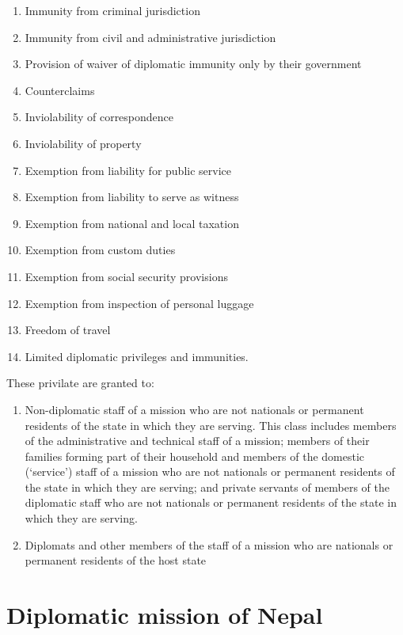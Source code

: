 \documentclass[
  openany]{book}
\providecommand{\tightlist}{%
  \setlength{\itemsep}{0pt}\setlength{\parskip}{0pt}}
\begin{document}
\begin{enumerate}
\def\labelenumi{\arabic{enumi}.}
\item
  Immunity from criminal jurisdiction
\item
  Immunity from civil and administrative jurisdiction
\item
  Provision of waiver of diplomatic immunity only by their government
\item
  Counterclaims
\item
  Inviolability of correspondence
\item
  Inviolability of property
\item
  Exemption from liability for public service
\item
  Exemption from liability to serve as witness
\item
  Exemption from national and local taxation
\item
  Exemption from custom duties
\item
  Exemption from social security provisions
\item
  Exemption from inspection of personal luggage
\item
  Freedom of travel
\item
  Limited diplomatic privileges and immunities.
\end{enumerate}

These privilate are granted to:

\begin{enumerate}
\def\labelenumi{\arabic{enumi}.}
\tightlist
\item
  Non-diplomatic staff of a mission who are not nationals or permanent residents of the state in which they are serving. This class includes members of the administrative and technical staff of a mission; members of their families forming part of their household and members of the domestic (`service') staff of a mission who are not nationals or permanent residents of the state in which they are serving; and private servants of members of the diplomatic staff who are not nationals or permanent residents of the state in which they are serving.
\item
  Diplomats and other members of the staff of a mission who are nationals or permanent residents of the host state
\end{enumerate}

\hypertarget{diplomatic-mission-of-nepal}{%
\section{Diplomatic mission of Nepal}\label{diplomatic-mission-of-nepal}}
\end{document}
